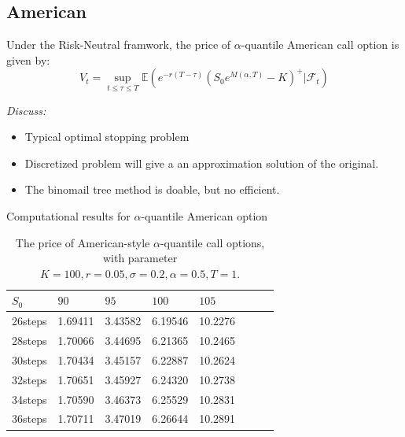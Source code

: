 \documentclass[cjk]{beamer}
\begin{document}
\subsection{American}
\begin{frame}
Under the Risk-Neutral framwork, the price of $\alpha$-quantile American call option
is given by:
\[
V_t = \sup_{t \leq\tau\leq T}
\mathbb{E}\left(e^{-r(T-\tau)}(S_0 e^{M(\alpha,T)} - K)^+|\mathcal{F}_t\right)
\] 

{\em Discuss:}
\begin{itemize}
\item Typical optimal stopping problem
\item Discretized problem will give a an approximation solution of the original. 
\item The binomail tree method is doable, but no efficient.
\end{itemize}
\end{frame}

\begin{frame}{Computational results for $\alpha$-quantile American option}
\begin{table}[p]
\caption{The price of American-style $\alpha$-quantile call options, with parameter
	$K=100, r=0.05, \sigma=0.2, \alpha=0.5, T=1$. 
	}
\begin{center}
\begin{tabular}{l|lllllll}
$S_0$ & $90$ & $95$ & $100$ & $105$ \\
\hline
26steps & 1.69411 & 3.43582 & 6.19546 & 10.2276 \\
28steps & 1.70066 & 3.44695 & 6.21365 & 10.2465 \\
30steps & 1.70434 & 3.45157 & 6.22887 & 10.2624 \\
32steps & 1.70651 & 3.45927 & 6.24320 & 10.2738 \\
34steps & 1.70590 & 3.46373 & 6.25529 & 10.2831 \\
36steps & 1.70711 & 3.47019 & 6.26644 & 10.2891 \\
\end{tabular}
\end{center}
\label{fig:amer5}
\end{table}
\end{frame}
\end{document}
